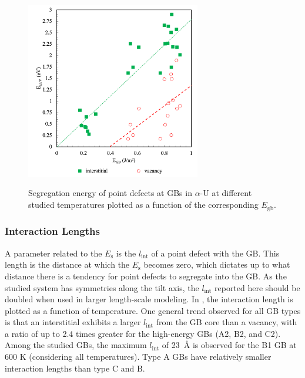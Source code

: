 \documentclass[review]{elsarticle}
\begin{document}
\begin{figure}[h!]
\centering
\includegraphics[width = 3in]{SE_GB.png}\\
\caption{Segregation energy of point defects at GBs in $\alpha$-U at different studied temperatures plotted as a function of the corresponding $E_{\mathrm{gb}}$.}
\label{fig:SE_GB}
\end{figure}

\FloatBarrier

\subsubsection{Interaction Lengths}
\par A parameter related to the $E_{\mathrm{s}}$ is the  $l_{\mathrm{int}}$ of a point defect with the GB. This length is the distance at which the $E_{\mathrm{s}}$ becomes zero, which dictates up to what distance there is a tendency for point defects to segregate into the GB. As the studied system has symmetries along the tilt axis, the $l_{\mathrm{int}}$ reported here should be doubled when used in larger length-scale modeling. In , the interaction length is plotted as a function of temperature. One general trend observed for all GB types is that an interstitial exhibits a larger  $l_{\mathrm{int}}$ from the GB core than a vacancy, with a ratio of up to 2.4 times greater for the high-energy GBs (A2, B2, and C2). Among the studied GBs, the maximum  $l_{\mathrm{int}}$ of 23~{\AA} is observed for the B1 GB at 600 K (considering all temperatures). Type A GBs have relatively smaller interaction lengths than type C and B. 
\end{document}
